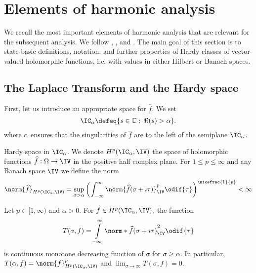 \section{Elements of harmonic analysis} \label{sec:Analysis}

We recall the most important elements of harmonic analysis that are relevant for the subsequent analysis. We follow \cite{partingtonBanachSpacesAnalytic,partingtonLinearOperatorsLinear2004,ricciHardySpacesOne}, \cite[Ch. 3, 7, 8]{hoffman_banach_2014}, \cite[Ch. 4]{RR97} and \cite[Section 6.4]{hille1996functional}. The main goal of this section is to state basic definitions, notation, and further properties of Hardy classes of vector-valued holomorphic functions, i.e. with values in either Hilbert or Banach spaces.


\subsection{The Laplace Transform and the Hardy space}

First, let us introduce an appropriate space for $\widehat{f}$. We set
\begin{align}
	\IC_\alpha \defeq\{s \in \mathbb{C}: \,\Re(s) > \alpha \}.
\end{align}
where $\alpha$ ensures that the singularities of $\widehat{f}$ are to the left of the semiplane $\IC_\alpha$.
\begin{definition}{Hardy space in $\IC_\alpha$.} \label{df:Hardy-plane}
    We denote $H^p(\IC_\alpha,\IV)$ the space of holomorphic functions $\widehat{f}: \Omega \rightarrow \IV$ in the positive half complex plane. For $1\leq p \leq \infty$ and any Banach space $\IV$ we define the norm
    \begin{equation} \label{eq:norm-c}
        \norm{\widehat{f}}_{H^p(\IC_\alpha, \IV)} = \sup_{\sigma>\alpha} \left(\int_{-\infty}^{\infty} \norm{\widehat{f}(\sigma + \imath \tau)}_{\IV}^p \odif{\tau} \right)^{\nicefrac{1}{p}} < \infty
    \end{equation}
\end{definition}
\begin{proposition}\label{prop:hardy-plane-limit1}
Let $p\in [1,\infty)$ and $\alpha>0$. For $f \in H^p(\IC_\alpha,\IV)$, the function 
	\begin{equation}
		T(\sigma,f) = \int\limits_{-\infty}^{\infty} \norm*{\widehat{f}(\sigma+\imath \tau)}^2_\IV \odif{\tau}
	\end{equation}
	is continuous monotone decreasing function of $\sigma$ for $\sigma \geq \alpha$. 
	In particular, $T(\alpha,f) = \norm{f}^p_{H^p(\IC_\alpha,\IV)}$ and $\displaystyle\lim_{\sigma \rightarrow \infty} T(\sigma,f)  = 0$.
\end{proposition}

